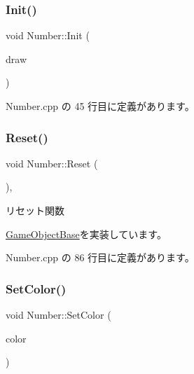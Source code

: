 \subsubsection{\texorpdfstring{Init()}{Init()}}
{\footnotesize\ttfamily void Number\+::\+Init (\begin{DoxyParamCaption}\item[{\mbox{\hyperlink{class_draw_base}{Draw\+Base}} $\ast$}]{draw }\end{DoxyParamCaption})}



 Number.\+cpp の 45 行目に定義があります。

\mbox{\label{class_number_a7c6facdb1b3d0acc8309e0a915863d44}} 
\subsubsection{\texorpdfstring{Reset()}{Reset()}}
{\footnotesize\ttfamily void Number\+::\+Reset (\begin{DoxyParamCaption}{ }\end{DoxyParamCaption})\hspace{0.3cm}{\ttfamily [override]}, {\ttfamily [virtual]}}



リセット関数 



\mbox{\hyperlink{class_game_object_base_a85c59554f734bcb09f1a1e18d9517dce}{Game\+Object\+Base}}を実装しています。



 Number.\+cpp の 86 行目に定義があります。

\mbox{\label{class_number_a1ea98cdee888a040f4530a6654657c44}} 
\subsubsection{\texorpdfstring{Set\+Color()}{SetColor()}}
{\footnotesize\ttfamily void Number\+::\+Set\+Color (\begin{DoxyParamCaption}\item[{\mbox{\hyperlink{_vector3_d_8h_a680c30c4a07d86fe763c7e01169cd6cc}{X\+Color4}}}]{color }\end{DoxyParamCaption})}



